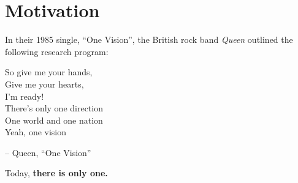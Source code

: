 \setcounter{section}{0}

\section{Motivation}

In their 1985 single, \enquote{One Vision}, 
the British rock band \textit{Queen} outlined the 
following research program:
\begin{center}
  So give me your hands, \\
  Give me your hearts,\\
  I'm ready!\\
  There's only one direction\\
  One world and one nation\\
  Yeah, one vision
\end{center}
\begin{flushright}
  \small{
  -- Queen, ``One Vision''}
\end{flushright}

Today, \textbf{there is only one.}
